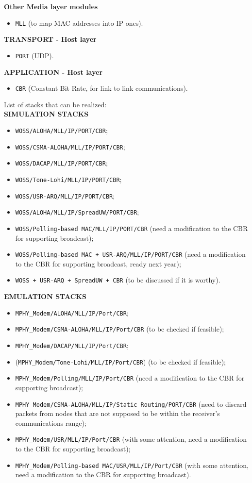 \documentclass[11pt,journal,draftclsnofoot,onecolumn,twoside,letterpaper]{IEEEtran}
\theoremstyle{definition} \newtheorem{definition}[]{Definition}
\theoremstyle{theorem} \newtheorem{theorem}[]{Theorem}
\begin{document}
{\bf Other Media layer modules}
   \begin{itemize}
     \item {\tt MLL} (to map MAC addresses into IP ones).
   \end{itemize}
{\bf TRANSPORT - Host layer}
   \begin{itemize}
     \item {\tt PORT} (UDP).
    \end{itemize}
{\bf APPLICATION - Host layer}
   \begin{itemize}
     \item {\tt CBR} (Constant Bit Rate, for link to link communications).
    \end{itemize}
List of stacks that can be realized:\\
{\bf SIMULATION STACKS}
   \begin{itemize}
     \item {\tt WOSS/ALOHA/MLL/IP/PORT/CBR};
     \item {\tt WOSS/CSMA-ALOHA/MLL/IP/PORT/CBR};
     \item {\tt WOSS/DACAP/MLL/IP/PORT/CBR};
     \item {\tt WOSS/Tone-Lohi/MLL/IP/PORT/CBR};
     \item {\tt WOSS/USR-ARQ/MLL/IP/PORT/CBR};
     \item {\tt WOSS/ALOHA/MLL/IP/SpreadUW/PORT/CBR};
     \item {\tt WOSS/Polling-based MAC/MLL/IP/PORT/CBR} (need a modification to the CBR for supporting broadcast);
     \item {\tt WOSS/Polling-based MAC + USR-ARQ/MLL/IP/PORT/CBR} (need a modification to the CBR for supporting broadcast, ready next year);
     \item {\tt WOSS + USR-ARQ + SpreadUW + CBR} (to be discussed if it is worthy).
   \end{itemize}
{\bf EMULATION STACKS}
\begin{itemize}
 \item {\tt MPHY\_Modem/ALOHA/MLL/IP/Port/CBR};
 \item {\tt MPHY\_Modem/CSMA-ALOHA/MLL/IP/Port/CBR} (to be checked if feasible);
 \item {\tt MPHY\_Modem/DACAP/MLL/IP/Port/CBR};
 \item ({\tt MPHY\_Modem/Tone-Lohi/MLL/IP/Port/CBR}) (to be checked if feasible);
 \item {\tt MPHY\_Modem/Polling/MLL/IP/Port/CBR} (need a modification to the CBR for supporting broadcast);
 \item {\tt MPHY\_Modem/CSMA-ALOHA/MLL/IP/Static Routing/PORT/CBR} (need to discard packets from nodes that are not supposed to be within the receiver’s communications range);
 \item {\tt MPHY\_Modem/USR/MLL/IP/Port/CBR} (with some attention, need a modification to the CBR for supporting broadcast);
 \item {\tt MPHY\_Modem/Polling-based MAC/USR/MLL/IP/Port/CBR} (with some attention, need a modification to the CBR for supporting broadcast).
\end{itemize}
\end{document}
